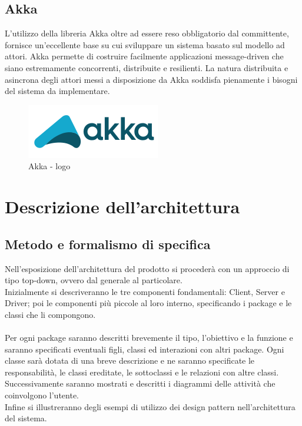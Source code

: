 \documentclass[a4paper]{article}
\begin{document}
	\subsection{Akka}
		L'utilizzo della libreria Akka oltre ad essere reso obbligatorio dal committente, fornisce un'eccellente base su cui sviluppare un sistema basato sul modello ad attori.
        Akka permette di costruire facilmente applicazioni message-driven che siano estremamente concorrenti, distribuite e resilienti.         
        La natura distribuita e asincrona degli attori messi a disposizione da Akka soddisfa pienamente i bisogni del sistema da implementare.
	\begin{figure} [H]
			\centering
			\includegraphics[scale=0.45]{immagini/ST/Akka.png}
			\caption{Akka - logo}
		\end{figure}	
	
	
	\newpage 
	\section{Descrizione dell'architettura}
		\subsection{Metodo e formalismo di specifica}
			Nell'esposizione dell'architettura del prodotto si procederà con un approccio di tipo top-down, ovvero dal generale al particolare. \\
			Inizialmente si descriveranno le tre componenti fondamentali: Client, Server e Driver; poi le componenti più piccole al loro interno, specificando i package e le classi che li compongono. \\ \\
			Per ogni package saranno descritti brevemente il tipo, l'obiettivo e la funzione e saranno specificati eventuali figli, classi ed interazioni con altri package.
			Ogni classe sarà dotata di una breve descrizione e ne saranno specificate le responsabilità, le classi ereditate, le sottoclassi e le relazioni con altre classi. \\
			Successivamente saranno mostrati e descritti i diagrammi delle attività che coinvolgono l'utente. \\
			Infine si illustreranno degli esempi di utilizzo dei design pattern nell'architettura del sistema.
\end{document}

